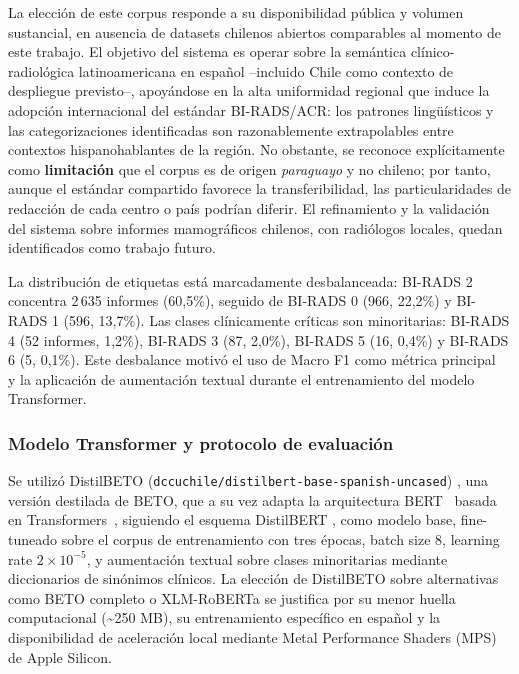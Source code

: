\documentclass[10pt,journal,a4paper]{IEEEtran}
\begin{document}
La elecci\'on de este corpus responde a su disponibilidad p\'ublica y volumen sustancial, en ausencia de datasets chilenos abiertos comparables al momento de este trabajo. El objetivo del sistema es operar sobre la sem\'antica cl\'inico-radiol\'ogica latinoamericana en espa\~nol --incluido Chile como contexto de despliegue previsto--, apoy\'andose en la alta uniformidad regional que induce la adopci\'on internacional del est\'andar BI-RADS/ACR: los patrones ling\"u\'isticos y las categorizaciones identificadas son razonablemente extrapolables entre contextos hispanohablantes de la regi\'on. No obstante, se reconoce expl\'icitamente como \textbf{limitaci\'on} que el corpus es de origen \emph{paraguayo} y no chileno; por tanto, aunque el est\'andar compartido favorece la transferibilidad, las particularidades de redacci\'on de cada centro o pa\'is podr\'ian diferir. El refinamiento y la validaci\'on del sistema sobre informes mamogr\'aficos chilenos, con radi\'ologos locales, quedan identificados como trabajo futuro.

La distribuci\'on de etiquetas est\'a marcadamente desbalanceada: BI-RADS 2 concentra 2\,635 informes (60,5\%), seguido de BI-RADS 0 (966, 22,2\%) y BI-RADS 1 (596, 13,7\%). Las clases cl\'inicamente cr\'iticas son minoritarias: BI-RADS 4 (52 informes, 1,2\%), BI-RADS 3 (87, 2,0\%), BI-RADS 5 (16, 0,4\%) y BI-RADS 6 (5, 0,1\%). Este desbalance motiv\'o el uso de Macro F1 como m\'etrica principal~\cite{sokolova2009systematic} y la aplicaci\'on de aumentaci\'on textual durante el entrenamiento del modelo Transformer.

\subsubsection{Modelo Transformer y protocolo de evaluaci\'on}
Se utiliz\'o DistilBETO (\texttt{dccuchile/distilbert-base-spanish-uncased}) \cite{canete2020}, una versi\'on destilada de BETO, que a su vez adapta la arquitectura BERT~\cite{devlin2019bert} basada en Transformers~\cite{vaswani2017attention}, siguiendo el esquema DistilBERT \cite{sanh2019}, como modelo base, fine-tuneado sobre el corpus de entrenamiento con tres \'epocas, batch size 8, learning rate $2\times10^{-5}$, y aumentaci\'on textual sobre clases minoritarias mediante diccionarios de sin\'onimos cl\'inicos. La elecci\'on de DistilBETO sobre alternativas como BETO completo o XLM-RoBERTa se justifica por su menor huella computacional (\textasciitilde 250 MB), su entrenamiento espec\'ifico en espa\~nol y la disponibilidad de aceleraci\'on local mediante Metal Performance Shaders (MPS) de Apple Silicon.
\end{document}
